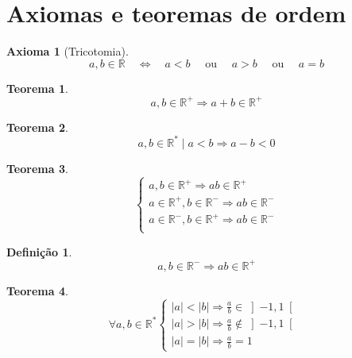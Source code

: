 \documentclass[
]{book}
\newtheorem{theorem}{Teorema}[chapter]
\newtheorem{proposition}{Axioma}[chapter]
\theoremstyle{definition}
\newtheorem{definition}{Definição}[chapter]
\theoremstyle{definition}
\theoremstyle{definition}
\theoremstyle{definition}
\theoremstyle{remark}
\begin{document}
\section{Axiomas e teoremas de ordem}\label{axiomas-e-teoremas-de-ordem}

\begin{proposition}[Tricotomia]
\protect\hypertarget{prp:irtricotomia}{}\label{prp:irtricotomia}\[
a,b \in \mathbb{R} \quad  \Leftrightarrow \quad  a < b \quad \text{ ou } \quad a > b \quad \text{ ou } \quad  a = b
\]
\end{proposition}

\begin{theorem}
\protect\hypertarget{thm:thmordsum}{}\label{thm:thmordsum}\[
a, b \in \mathbb{R}^+ \Rightarrow a + b \in \mathbb{R}^+
\]
\end{theorem}

\begin{theorem}
\protect\hypertarget{thm:thmordsubrt}{}\label{thm:thmordsubrt}\[
a, b \in \mathbb{R}^* \mid a < b \Rightarrow a-b<0
\]
\end{theorem}

\begin{theorem}
\protect\hypertarget{thm:thmordmult}{}\label{thm:thmordmult}\[
\left\{\begin{matrix}
a,b \in \mathbb{R}^+ \Rightarrow ab \in \mathbb{R}^+ \\
a \in \mathbb{R}^+, b \in \mathbb{R}^- \Rightarrow ab \in \mathbb{R}^- \\
a \in \mathbb{R}^-, b \in \mathbb{R}^+ \Rightarrow ab \in \mathbb{R}^- \\
\end{matrix}\right.
\]
\end{theorem}

\begin{definition}
\protect\hypertarget{def:defordmult}{}\label{def:defordmult}\[
a,b \in \mathbb{R}^- \Rightarrow ab \in \mathbb{R}^+ 
\]
\end{definition}

\begin{theorem}
\protect\hypertarget{thm:thmorddiv}{}\label{thm:thmorddiv}\[
\forall a,b \in \mathbb{R}^* 
\left\{\begin{matrix}
|a| < |b| \Rightarrow \frac{a}{b} \in \left]-1,1 \right[\ \\
|a| > |b| \Rightarrow \frac{a}{b} \notin \left]-1,1 \right[\ \\
|a| = |b| \Rightarrow \frac{a}{b} = 1
\end{matrix}\right.
\]
\end{theorem}
\end{document}
